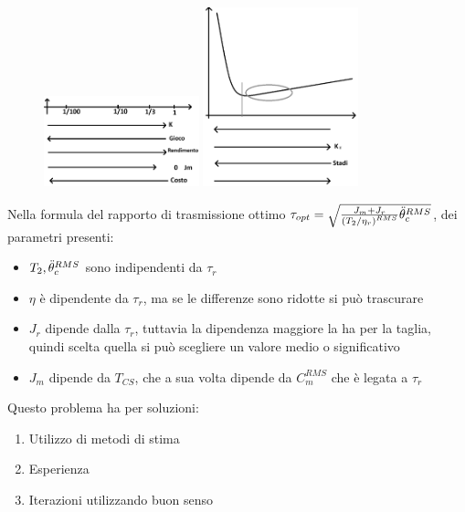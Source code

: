 \begin{figure}[h]
    \centering
    \includegraphics[width=0.4\textwidth]{Immagini/numero_std_rid_tau_opt.png}
    \includegraphics[width=0.4\textwidth]{Immagini/riepilogo_tau_opt.png}
\end{figure}

Nella formula del rapporto di trasmissione ottimo  \(\tau_{opt} = \sqrt{\frac{J_m + J_r}{\left(T_2/\eta_r\right)^{RMS}}\Ddot{\theta}_c^{RMS}}\), dei parametri presenti:
\begin{itemize}
    \item \(T_2, \Ddot{\theta}_c^{RMS}\) sono indipendenti da \(\tau_r\)
    \item \(\eta\) è dipendente da \(\tau_r\), ma se le differenze sono ridotte si può trascurare
    \item \(J_r\) dipende dalla \(\tau_r\), tuttavia la dipendenza maggiore la ha per la taglia, quindi scelta quella si può scegliere un valore medio o significativo
    \item \(J_m\) dipende da \(T_{CS}\), che a sua volta dipende da \(C_m^{RMS}\) che è legata a \(\tau_r\)
\end{itemize}

Questo problema ha per soluzioni:
\begin{enumerate}[label=(\roman*)]
    \item Utilizzo di metodi di stima
    \item Esperienza
    \item Iterazioni utilizzando buon senso
\end{enumerate}

